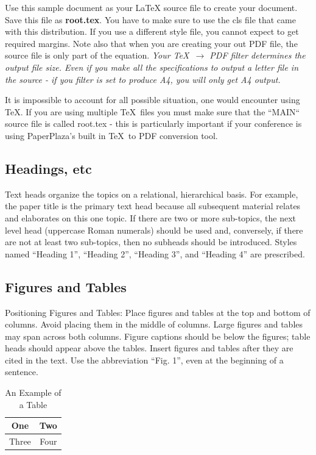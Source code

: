 \documentclass[letterpaper, 10 pt, conference]{ieeeconf}  %
\begin{document}
Use this sample document as your LaTeX source file to create your document. Save this file as {\bf root.tex}. You have to make sure to use the cls file that came with this distribution. If you use a different style file, you cannot expect to get required margins. Note also that when you are creating your out PDF file, the source file is only part of the equation. \emph{Your \TeX\ $\rightarrow$ PDF filter determines the output file size. Even if you make all the specifications to output a letter file in the source - if you filter is set to produce A4, you will only get A4 output.}

It is impossible to account for all possible situation, one would encounter using \TeX. If you are using multiple \TeX\ files you must make sure that the ``MAIN`` source file is called root.tex - this is particularly important if your conference is using PaperPlaza's built in \TeX\ to PDF conversion tool.

\subsection{Headings, etc}

Text heads organize the topics on a relational, hierarchical basis. For example, the paper title is the primary text head because all subsequent material relates and elaborates on this one topic. If there are two or more sub-topics, the next level head (uppercase Roman numerals) should be used and, conversely, if there are not at least two sub-topics, then no subheads should be introduced. Styles named ``Heading 1'', ``Heading 2'', ``Heading 3'', and ``Heading 4'' are prescribed.

\subsection{Figures and Tables}

Positioning Figures and Tables: Place figures and tables at the top and bottom of columns. Avoid placing them in the middle of columns. Large figures and tables may span across both columns. Figure captions should be below the figures; table heads should appear above the tables. Insert figures and tables after they are cited in the text. Use the abbreviation ``Fig. 1'', even at the beginning of a sentence.

\begin{table}[h]
\caption{An Example of a Table}
\label{table_example}
\begin{center}
\begin{tabular}{|c||c|}
\hline
One & Two\\
\hline
Three & Four\\
\hline
\end{tabular}
\end{center}
\end{table}
\end{document}
